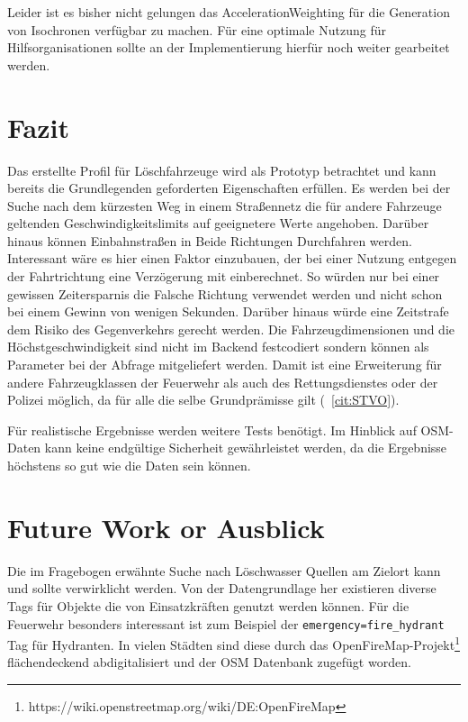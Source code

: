 \documentclass[12pt,a4paper]{article}
\begin{document}
Leider ist es bisher nicht gelungen das AccelerationWeighting für die Generation von Isochronen verfügbar zu machen.
Für eine optimale Nutzung für Hilfsorganisationen sollte an der Implementierung hierfür noch weiter gearbeitet werden.


\newpage
\section{Fazit}

Das erstellte Profil für Löschfahrzeuge wird als Prototyp betrachtet und kann bereits die Grundlegenden geforderten Eigenschaften erfüllen. Es werden bei der Suche nach dem kürzesten Weg in einem Straßennetz die für andere Fahrzeuge geltenden Geschwindigkeitslimits auf geeignetere Werte angehoben.
Darüber hinaus können Einbahnstraßen in Beide Richtungen Durchfahren werden. Interessant wäre es hier einen Faktor einzubauen, der bei einer Nutzung entgegen der Fahrtrichtung eine Verzögerung mit einberechnet.
So würden nur bei einer gewissen Zeitersparnis die Falsche Richtung verwendet werden und nicht schon bei einem Gewinn von wenigen Sekunden. Darüber hinaus würde eine Zeitstrafe dem Risiko des Gegenverkehrs gerecht werden.
Die Fahrzeugdimensionen und die Höchstgeschwindigkeit sind nicht im Backend festcodiert sondern können als Parameter bei der Abfrage mitgeliefert werden. Damit ist eine Erweiterung für andere Fahrzeugklassen der Feuerwehr als auch des Rettungsdienstes oder der Polizei möglich, da für alle die selbe Grundprämisse gilt (~\ref{cit:STVO}).

Für realistische Ergebnisse werden weitere Tests benötigt. Im Hinblick auf OSM-Daten kann keine endgültige Sicherheit gewährleistet werden, da die Ergebnisse höchstens so gut wie die Daten sein können.

\newpage
\section{Future Work or Ausblick}

Die im Fragebogen erwähnte Suche nach Löschwasser Quellen am Zielort kann und sollte verwirklicht werden. Von der Datengrundlage her existieren diverse Tags für Objekte die von Einsatzkräften genutzt werden können. Für die Feuerwehr besonders interessant ist zum Beispiel der \lstinline{emergency=fire_hydrant} Tag für Hydranten. In vielen Städten sind diese durch das OpenFireMap-Projekt\footnote{https://wiki.openstreetmap.org/wiki/DE:OpenFireMap} flächendeckend abdigitalisiert und der OSM Datenbank zugefügt worden.
\end{document}
